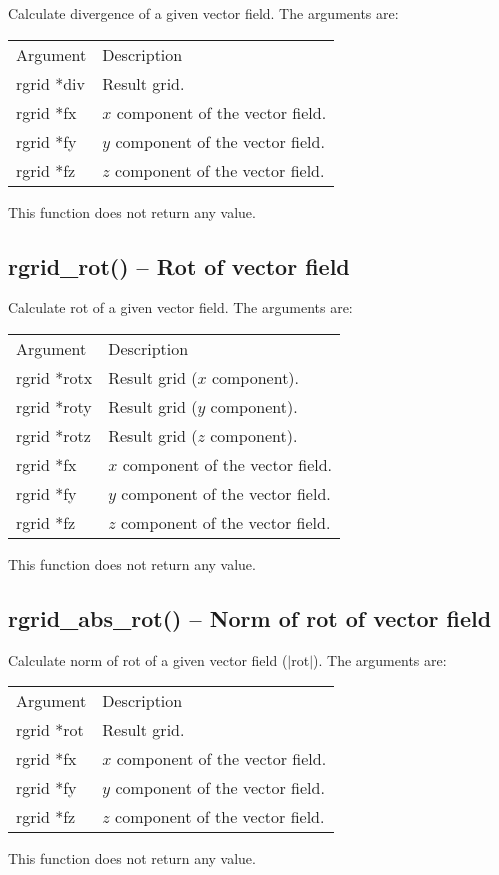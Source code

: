 \documentclass[12pt,letterpaper]{report}
\begin{document}
Calculate divergence of a given vector field. The arguments are:
\begin{longtable}{p{} p{}}
Argument & Description\\
\cline{1-2}
rgrid *div & Result grid.\\
rgrid *fx  & $x$ component of the vector field.\\
rgrid *fy  & $y$ component of the vector field.\\
rgrid *fz  & $z$ component of the vector field.\\
\end{longtable}
\noindent
This function does not return any value. 

\subsection{rgrid\_rot() -- Rot of vector field}

Calculate rot of a given vector field. The arguments are:
\begin{longtable}{p{} p{}}
Argument & Description\\
\cline{1-2}
rgrid *rotx & Result grid ($x$ component).\\
rgrid *roty & Result grid ($y$ component).\\
rgrid *rotz & Result grid ($z$ component).\\
rgrid *fx  & $x$ component of the vector field.\\
rgrid *fy  & $y$ component of the vector field.\\
rgrid *fz  & $z$ component of the vector field.\\
\end{longtable}
\noindent
This function does not return any value. 

\subsection{rgrid\_abs\_rot() -- Norm of rot of vector field}

Calculate norm of rot of a given vector field ($|$rot$|$). The arguments are:
\begin{longtable}{p{} p{}}
Argument & Description\\
\cline{1-2}
rgrid *rot & Result grid.\\
rgrid *fx  & $x$ component of the vector field.\\
rgrid *fy  & $y$ component of the vector field.\\
rgrid *fz  & $z$ component of the vector field.\\
\end{longtable}
\noindent
This function does not return any value. 
\end{document}
